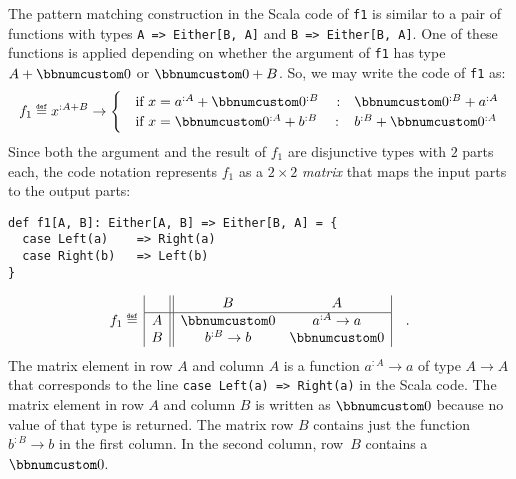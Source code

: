 The pattern matching construction in the Scala code of \lstinline!f1!
is similar to a pair of functions with types \lstinline!A => Either[B, A]!
and \lstinline!B => Either[B, A]!. One of these functions is applied
depending on whether the argument of \lstinline!f1! has type $A+\bbnum 0$
or $\bbnum 0+B$. So, we may write the code of \lstinline!f1! as:
\[
f_{1}\triangleq x^{:A+B}\rightarrow\begin{cases}
\quad\text{if }x=a^{:A}+\bbnum 0^{:B}\quad: & \bbnum 0^{:B}+a^{:A}\\
\quad\text{if }x=\bbnum 0^{:A}+b^{:B}\quad: & b^{:B}+\bbnum 0^{:A}
\end{cases}
\]
Since both the argument and the result of $f_{1}$ are disjunctive
types with $2$ parts each, the code notation represents $f_{1}$
as a $2\times2$ \emph{matrix} that maps the input parts to the output
parts:
\begin{lstlisting}
def f1[A, B]: Either[A, B] => Either[B, A] = {
  case Left(a)    => Right(a)
  case Right(b)   => Left(b)
}
\end{lstlisting}
\[
f_{1}\triangleq\,\begin{array}{|c||cc|}
 & B & A\\
\hline A & \bbnum 0 & a^{:A}\rightarrow a\\
B & b^{:B}\rightarrow b & \bbnum 0
\end{array}\quad.
\]
 The matrix element in
row $A$ and column $A$ is a function $a^{:A}\rightarrow a$ of type
$A\rightarrow A$ that corresponds to the line \lstinline!case Left(a) => Right(a)!
in the Scala code. The matrix element in row $A$ and column $B$
is written as $\bbnum 0$ because no value of that type is returned.
The matrix row $B$ contains just the function $b^{:B}\rightarrow b$
in the first column. In the second column, row~$B$ contains a $\bbnum 0$.

